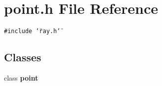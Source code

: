 \section{point.h File Reference}
\label{point_8h}
{\tt \#include \char`\"{}ray.h\char`\"{}}\par
\subsection*{Classes}
\begin{CompactItemize}
\item 
class {\bf point}
\end{CompactItemize}
